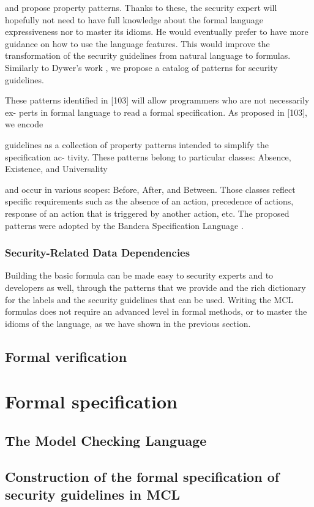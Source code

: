 \documentclass[10pt]{article}
\begin{document}
and propose property patterns. Thanks to these, the security expert will hopefully not
need to have full knowledge about the formal language expressiveness nor to master its
idioms. He would eventually prefer to have more guidance on how to use the language
features. This would improve the transformation of the security guidelines from natural
language to formulas.
Similarly to Dywer’s work \cite{Dwyer::1999}, we propose a catalog of patterns for security guidelines.

These patterns identified in [103] will allow programmers who are not necessarily ex-
perts in formal language to read a formal specification. As proposed in [103], we encode

guidelines as a collection of property patterns intended to simplify the specification ac-
tivity. These patterns belong to particular classes: Absence, Existence, and Universality

and occur in various scopes: Before, After, and Between. Those classes reflect specific
requirements such as the absence of an action, precedence of actions, response of an
action that is triggered by another action, etc. The proposed patterns were adopted by
the Bandera Specification Language \cite{corbett2002expressing}.

\subsubsection{Security-Related Data Dependencies}
Building the basic formula can be made easy to security experts and to developers as
well, through the patterns that we provide and the rich dictionary for the labels and
the security guidelines that can be used. Writing the MCL formulas does not require
an advanced level in formal methods, or to master the idioms of the language, as we
have shown in the previous section.


\subsection {Formal verification}
\section{Formal specification}
\subsection {The Model Checking Language}
\subsection {Construction of the formal specification of security guidelines in MCL}
\end{document}
